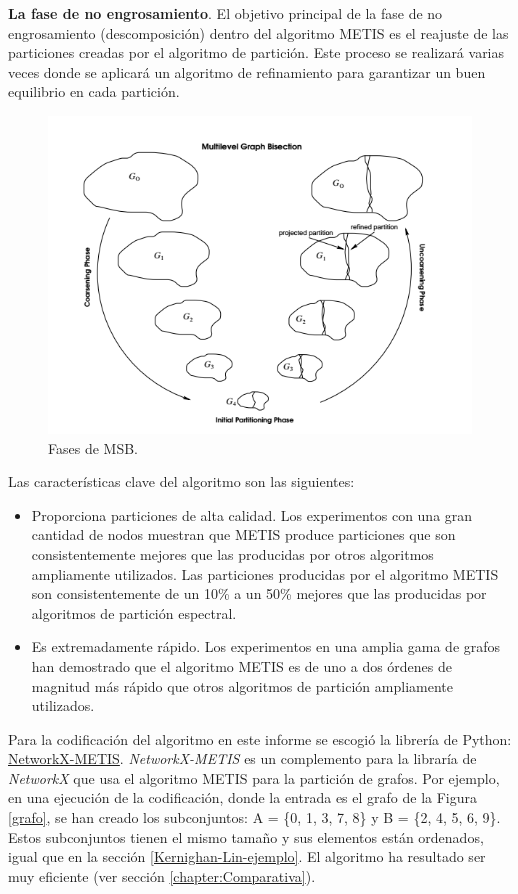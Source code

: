 \textbf{La fase de no engrosamiento}. El objetivo principal de la fase de no engrosamiento (descomposición) dentro del algoritmo METIS es el reajuste de las particiones creadas por el algoritmo de partición. Este proceso se realizará varias veces donde se aplicará un algoritmo de refinamiento para garantizar un buen equilibrio en cada partición.

\begin{figure}[h]
	\centering
	\includegraphics[scale=0.7]{Figures/fases}
	\vspace{1mm}
	\caption{Fases de MSB.}
	\label{fases}
\end{figure}

\newpage
Las características clave del algoritmo son las siguientes:

\begin{itemize}
	\item Proporciona particiones de alta calidad. Los experimentos con una gran cantidad de nodos muestran que METIS produce particiones que son consistentemente mejores que las producidas por otros algoritmos ampliamente utilizados. Las particiones producidas por el algoritmo METIS son consistentemente de un 10\% a un 50\% mejores que las producidas por algoritmos de partición espectral.
	\item Es extremadamente rápido. Los experimentos en una amplia gama de grafos han demostrado que el algoritmo METIS es de uno a dos órdenes de magnitud más rápido que otros algoritmos de partición ampliamente utilizados.
\end{itemize}

Para la codificación del algoritmo en este informe se escogió la librería de Python: \href{https://networkx-metis.readthedocs.io/en/latest/reference/generated/nxmetis.partition.html#nxmetis.partition}{NetworkX-METIS}. \textit{NetworkX-METIS} es un complemento para la libraría de \textit{NetworkX} que usa el algoritmo METIS para la partición de grafos. Por ejemplo, en una ejecución de la codificación, donde la entrada es el grafo de la Figura \ref{grafo}, se han creado los subconjuntos: A = \{0, 1, 3, 7, 8\} y B = \{2, 4, 5, 6, 9\}. Estos subconjuntos tienen el mismo tamaño y sus elementos están ordenados, igual que en la sección \ref{Kernighan-Lin-ejemplo}. El algoritmo ha resultado ser muy eficiente (ver sección \ref{chapter:Comparativa}).